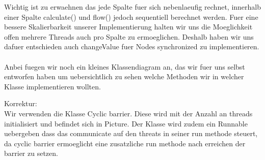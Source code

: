 \documentclass[12pt]{article}
\begin{document}
Wichtig ist zu erwaehnen das jede Spalte fuer sich nebenlaeufig rechnet, innerhalb einer Spalte calculate() und flow() jedoch sequentiell berechnet werden. Fuer eine bessere Skalierbarkeit unserer Implementierung halten wir uns die Moeglichkeit offen mehrere Threads auch pro Spalte zu ermoeglichen. Deshalb haben wir uns dafuer entschieden auch changeValue fuer Nodes synchronized zu implementieren.\\\\

Anbei fuegen wir noch ein kleines Klassendiagram an, das wir fuer uns selbst entworfen haben um uebersichtlich zu sehen welche Methoden wir in welcher Klasse implementieren wollten.

Korrektur:\\
Wir verwenden die Klasse Cyclic barrier. Diese wird mit der Anzahl an threads initialisiert und befindet sich in Picture. Der Klasse wird zudem ein Runnable uebergeben dass das communicate auf den threats in seiner run methode steuert, da cyclic barrier ermoeglicht eine zusatzliche run methode nach erreichen der barrier zu setzen.

\newpage
\end{document}
